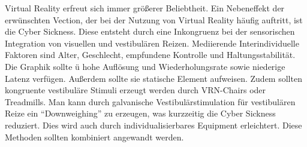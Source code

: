 Virtual Reality erfreut sich immer gr\"o{\ss}erer Beliebtheit. Ein  Nebeneffekt der erw\"unschten Vection, der bei der Nutzung von Virtual Reality h\"aufig auftritt, ist die Cyber Sickness.
Diese entsteht durch eine Inkongruenz bei der sensorischen Integration von visuellen und vestibul\"aren Reizen.
Mediierende Interindividuelle Faktoren sind Alter, Geschlecht, empfundene Kontrolle und Haltungsstabilit\"at.
Die Graphik sollte \"u hohe Aufl\"osung und Wiederholungsrate sowie niederige Latenz verf\"ugen. Au{\ss}erdem sollte sie statische Element aufweisen. Zudem sollten kongruente vestibul\"are Stimuli erzeugt werden durch VRN-Chairs oder Treadmills. Man kann durch galvanische Vestibul\"arstimulation f\"ur vestibul\"aren Reize ein "`Downweighing"' zu erzeugen, was kurzzeitig die Cyber Sickness reduziert. Dies wird auch durch individualisierbares Equipment erleichtert. Diese Methoden sollten kombiniert angewandt werden.




